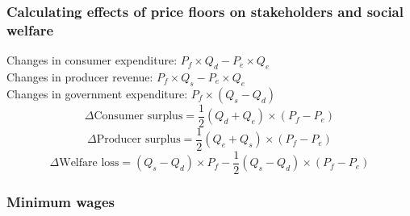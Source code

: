 \documentclass[a4paper,12pt]{article}
\begin{document}
\subsubsection*{Calculating effects of price floors on stakeholders and social welfare}
Changes in consumer expenditure: $P_f\times Q_d-P_e\times Q_e$\\
Changes in producer revenue: $P_f\times Q_s-P_e\times Q_e$\\
Changes in government expenditure: $P_f\times (Q_s-Q_d)$
\[\Delta \text{Consumer surplus}=\dfrac{1}{2}(Q_d+Q_e)\times (P_f-P_e)\]
\[\Delta \text{Producer surplus}=\dfrac{1}{2}(Q_e+Q_s)\times (P_f-P_e)\]
\[\Delta \text{Welfare loss}=(Q_s-Q_d)\times P_f-\dfrac{1}{2}(Q_s-Q_d)\times (P_f-P_e)\]
\subsubsection*{Minimum wages}
\end{document}
